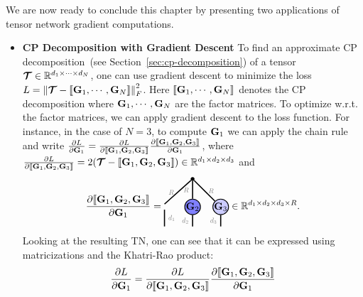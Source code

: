 We are now ready to conclude this chapter by presenting two applications of tensor network gradient computations. 
\begin{itemize}
\item\textbf{CP Decomposition with Gradient Descent} To find an approximate CP decomposition~(see Section~\ref{sec:cp-decomposition}) of a tensor $\bm{\mathcal{T}}\in\mathbb{R}^{d_1\times\cdots\times d_N}$, one can use gradient descent to minimize the loss $L = \left\lVert\bm{\mathcal{T}}-\llbracket \mathbf{G}_1,\cdots,\mathbf{G}_N \rrbracket\right\rVert^2_F$. Here $\llbracket \mathbf{G}_1,\cdots,\mathbf{G}_N \rrbracket$ denotes the CP decomposition where $\mathbf{G}_1,\cdots,\mathbf{G}_N$ are the factor matrices. To optimize w.r.t. the factor matrices, we can apply gradient descent to the loss function. For instance, in the case of $N=3$, to compute $\mathbf{G}_1$  we can apply the chain rule and write $\frac{\partial L}{\partial\mathbf{G}_1} = \frac{\partial L}{\partial\llbracket \mathbf{G}_1,\mathbf{G}_2,\mathbf{G}_3 \rrbracket}\frac{\partial\llbracket \mathbf{G}_1,\mathbf{G}_2,\mathbf{G}_3 \rrbracket}{\partial\mathbf{G}_1}$, where $\frac{\partial L}{\partial\llbracket \mathbf{G}_1,\mathbf{G}_2,\mathbf{G}_3 \rrbracket}= 2(\bm{\mathcal{T}}-\llbracket \mathbf{G}_1,\mathbf{G}_2,\mathbf{G}_3 \rrbracket)\in\mathbb{R}^{d_1\times d_2\times d_3}$ and 
\begin{align*}
\frac{\partial\CP{\Gb_1,\Gb_2,\Gb_3}}{\partial\Gb_1}
=
\begin{tikzpicture}[baseline=\baseline]
    \tikzset{tensor/.style = {minimum size = 0.5cm,shape = circle,thick,draw=black,inner sep = 0pt}, edge/.style   = {thick,line width=.4mm},every loop/.style={}}
    \def\y{0}
    \def\x{0}
 \node[tensor,fill=blue!50!white] (G2) at (\x+1,\y){$\Gb_2$};
   \node[tensor,fill=blue!20!white] (G3) at (\x+2,\y){$\Gb_3$};
    \draw  node[fill = black,circle,inner sep=0pt,minimum size=4pt] (m) at (\x+1,\y+1) {};
    \draw[edge] (m) -- (\x,\y+0.1) node [midway,left] {\edgelabel{$R$}};
    \draw[edge] (G2) -- (m)node [midway,left] {\edgelabel{$R$}};
    \draw[edge] (G3) -- (m)node [midway,right] {\edgelabel{$R$}};
    \draw[edge](\x,\y-0.1) -- (\x,\y-0.7) node [midway,right] {\edgelabel{$d_1$}};
    \draw[edge](G2) -- (\x+1,\y-0.7)node [midway,left] {\edgelabel{$d_2$}};
    \draw[edge](G3) -- (\x+2,\y-0.7) node [midway,left] {\edgelabel{$d_3$}};
\end{tikzpicture}\in\RR^{d_1\times d_2\times d_3\times R}.
\end{align*}
Looking at the resulting TN, one can see that it can be expressed using matricizations and the Khatri-Rao product:
\begin{align*}
  \frac{\partial L}{\partial\Gb_1} 
&=
\frac{\partial L}{\partial\CP{\Gb_1,\Gb_2,\Gb_3}}\frac{\partial\CP{\Gb_1,\Gb_2,\Gb_3}}{\partial\Gb_1}\\

\end{align*}
\end{itemize}
